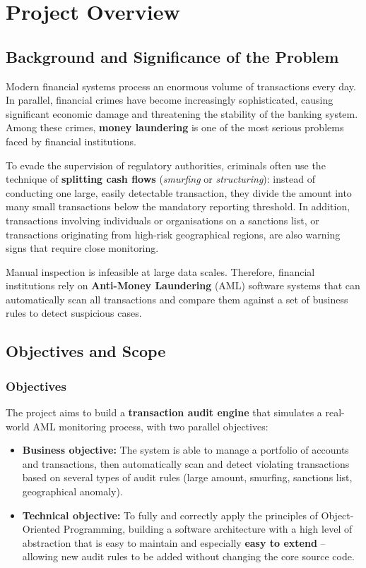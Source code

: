 \chapter{Project Overview}

\section{Background and Significance of the Problem}
    Modern financial systems process an enormous volume of transactions every day. In parallel, financial crimes have become increasingly sophisticated, causing significant economic damage and threatening the stability of the banking system. Among these crimes, \textbf{money laundering} is one of the most serious problems faced by financial institutions.

    To evade the supervision of regulatory authorities, criminals often use the technique of \textbf{splitting cash flows} (\textit{smurfing} or \textit{structuring}): instead of conducting one large, easily detectable transaction, they divide the amount into many small transactions below the mandatory reporting threshold. In addition, transactions involving individuals or organisations on a sanctions list, or transactions originating from high-risk geographical regions, are also warning signs that require close monitoring.

    Manual inspection is infeasible at large data scales. Therefore, financial institutions rely on \textbf{Anti-Money Laundering} (AML) software systems \cite{Chen2018AML} that can automatically scan all transactions and compare them against a set of business rules to detect suspicious cases.

\section{Objectives and Scope}
    \subsection{Objectives}
    The project aims to build a \textbf{transaction audit engine} that simulates a real-world AML monitoring process, with two parallel objectives:

    \begin{itemize}
        \item \textbf{Business objective:} The system is able to manage a portfolio of accounts and transactions, then automatically scan and detect violating transactions based on several types of audit rules (large amount, smurfing, sanctions list, geographical anomaly).
        \item \textbf{Technical objective:} To fully and correctly apply the principles of Object-Oriented Programming, building a software architecture with a high level of abstraction that is easy to maintain and especially \textbf{easy to extend} -- allowing new audit rules to be added without changing the core source code.
    \end{itemize}

